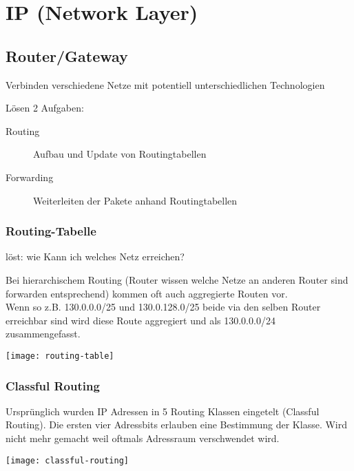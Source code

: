 \section{IP (Network Layer)}

\subsection{Router/Gateway}
Verbinden verschiedene Netze mit potentiell unterschiedlichen Technologien

Lösen 2 Aufgaben:
\begin{description}
	\item[Routing] Aufbau und Update von Routingtabellen
	\item[Forwarding] Weiterleiten der Pakete anhand Routingtabellen
\end{description}

\subsubsection{Routing-Tabelle}
löst: wie Kann ich welches Netz erreichen?

Bei hierarchischem Routing (Router wissen welche Netze an anderen Router sind
forwarden entsprechend) kommen oft auch aggregierte Routen vor.\\
Wenn so z.B. 130.0.0.0/25 und 130.0.128.0/25 beide via den selben Router
erreichbar sind wird diese Route aggregiert und als 130.0.0.0/24 zusammengefasst.

\begin{center}
	\texttt{[image: routing-table]}
\end{center}

\subsubsection{Classful Routing}

Ursprünglich wurden IP Adressen in 5 Routing Klassen eingetelt (Classful Routing).
Die ersten vier Adressbits erlauben eine Bestimmung der Klasse.
Wird nicht mehr gemacht weil oftmals Adressraum verschwendet wird.

\begin{center}
	\texttt{[image: classful-routing]}
\end{center}

